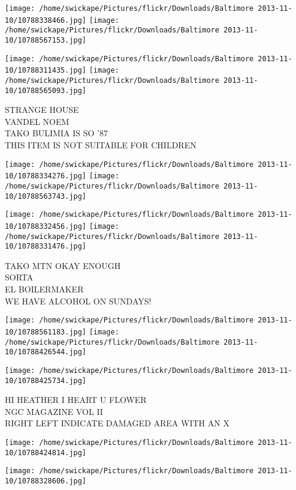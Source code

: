 \documentclass[10pt,letterpaper]{article}
\begin{document}
\texttt{[image: /home/swickape/Pictures/flickr/Downloads/Baltimore 2013-11-10/10788338466.jpg]}
\texttt{[image: /home/swickape/Pictures/flickr/Downloads/Baltimore 2013-11-10/10788567153.jpg]}

\texttt{[image: /home/swickape/Pictures/flickr/Downloads/Baltimore 2013-11-10/10788311435.jpg]}
\texttt{[image: /home/swickape/Pictures/flickr/Downloads/Baltimore 2013-11-10/10788565093.jpg]}

STRANGE HOUSE\\
VANDEL NOEM\\
TAKO BULIMIA IS SO '87\\
THIS ITEM IS NOT SUITABLE FOR CHILDREN\\
\pagebreak

\texttt{[image: /home/swickape/Pictures/flickr/Downloads/Baltimore 2013-11-10/10788334276.jpg]}
\texttt{[image: /home/swickape/Pictures/flickr/Downloads/Baltimore 2013-11-10/10788563743.jpg]}

\texttt{[image: /home/swickape/Pictures/flickr/Downloads/Baltimore 2013-11-10/10788332456.jpg]}
\texttt{[image: /home/swickape/Pictures/flickr/Downloads/Baltimore 2013-11-10/10788331476.jpg]}

TAKO MTN OKAY ENOUGH\\
SORTA\\
EL BOILERMAKER\\
WE HAVE ALCOHOL ON SUNDAYS!\\
\pagebreak

\texttt{[image: /home/swickape/Pictures/flickr/Downloads/Baltimore 2013-11-10/10788561183.jpg]}
\texttt{[image: /home/swickape/Pictures/flickr/Downloads/Baltimore 2013-11-10/10788426544.jpg]}

\vspace{0.25in}
\texttt{[image: /home/swickape/Pictures/flickr/Downloads/Baltimore 2013-11-10/10788425734.jpg]}

HI HEATHER I HEART U FLOWER\\
NGC MAGAZINE VOL II\\
RIGHT LEFT INDICATE DAMAGED AREA WITH AN X\\
\pagebreak

\texttt{[image: /home/swickape/Pictures/flickr/Downloads/Baltimore 2013-11-10/10788424814.jpg]}

\vspace{0.25in}
\texttt{[image: /home/swickape/Pictures/flickr/Downloads/Baltimore 2013-11-10/10788328606.jpg]}
\end{document}
